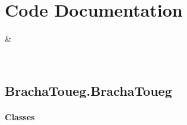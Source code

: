 \documentclass[letterpaper,10pt,english]{sphinxmanual}
\begin{document}
\sphinxstepscope


\chapter{Code Documentation}
\label{\detokenize{docs/BrachaToueg/code:code-documentation}}\label{\detokenize{docs/BrachaToueg/code::doc}}

\begin{savenotes}\sphinxattablestart
\sphinxthistablewithglobalstyle
\sphinxthistablewithnovlinesstyle
\centering
\begin{tabulary}{\linewidth}[t]{}
\sphinxtoprule
\sphinxtableatstartofbodyhook
\sphinxAtStartPar
{\hyperref[\detokenize{docs/BrachaToueg/generated/BrachaToueg.BrachaToueg:module-BrachaToueg.BrachaToueg}]{}}
&
\sphinxAtStartPar

\\
\sphinxbottomrule
\end{tabulary}
\sphinxtableafterendhook\par
\sphinxattableend\end{savenotes}

\sphinxstepscope


\section{BrachaToueg.BrachaToueg}
\label{\detokenize{docs/BrachaToueg/generated/BrachaToueg.BrachaToueg:module-BrachaToueg.BrachaToueg}}\label{\detokenize{docs/BrachaToueg/generated/BrachaToueg.BrachaToueg:brachatoueg-brachatoueg}}\label{\detokenize{docs/BrachaToueg/generated/BrachaToueg.BrachaToueg::doc}}\subsubsection*{Classes}


\begin{savenotes}\sphinxattablestart
\sphinxthistablewithglobalstyle
\sphinxthistablewithnovlinesstyle
\centering
\begin{tabulary}{\linewidth}[t]{}
\sphinxtoprule
\sphinxtableatstartofbodyhook\sphinxbottomrule
\end{tabulary}
\sphinxtableafterendhook\par
\sphinxattableend\end{savenotes}
\end{document}
